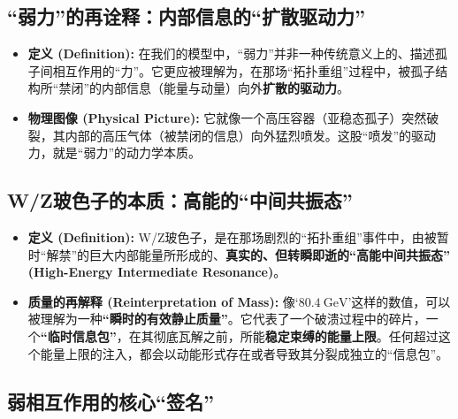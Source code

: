 \documentclass[12pt]{article}
\begin{document}
\subsection{“弱力”的再诠释：内部信息的``扩散驱动力''}

\begin{itemize}
    \item \textbf{定义 (Definition):} 在我们的模型中，``弱力''并非一种传统意义上的、描述孤子间相互作用的``力''。它更应被理解为，在那场``拓扑重组''过程中，被孤子结构所``禁闭''的内部信息（能量与动量）向外\textbf{扩散的驱动力}。
    \item \textbf{物理图像 (Physical Picture):} 它就像一个高压容器（亚稳态孤子）突然破裂，其内部的高压气体（被禁闭的信息）向外猛烈喷发。这股``喷发''的驱动力，就是``弱力''的动力学本质。
\end{itemize}

\subsection{W/Z玻色子的本质：高能的``中间共振态''}

\begin{itemize}
    \item \textbf{定义 (Definition):} W/Z玻色子，是在那场剧烈的``拓扑重组''事件中，由被暂时``解禁''的巨大内部能量所形成的、\textbf{真实的、但转瞬即逝的``高能中间共振态'' (High-Energy Intermediate Resonance)}。
    \item \textbf{质量的再解释 (Reinterpretation of Mass):} 像`$80.4~\text{GeV}$'这样的数值，可以被理解为一种\textbf{``瞬时的有效静止质量''}。它代表了一个破溃过程中的碎片，一个\textbf{``临时信息包''}，在其彻底瓦解之前，所能\textbf{稳定束缚的能量上限}。任何超过这个能量上限的注入，都会以动能形式存在或者导致其分裂成独立的``信息包''。
\end{itemize}

\subsection{弱相互作用的核心``签名''}
\end{document}
